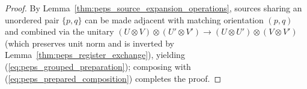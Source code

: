 \begin{proof}\leanok
    By Lemma~\ref{thm:peps_source_expansion_operations}, sources sharing an unordered pair $\{p,q\}$ can be made adjacent with matching orientation $(p,q)$ and combined via the unitary $(U\otimes V)\otimes(U'\otimes V')\to(U\otimes U')\otimes(V\otimes V')$ (which preserves unit norm and is inverted by Lemma~\ref{thm:peps_register_exchange}), yielding (\ref{eq:peps_grouped_preparation}); composing with (\ref{eq:peps_prepared_composition}) completes the proof.
\end{proof}
